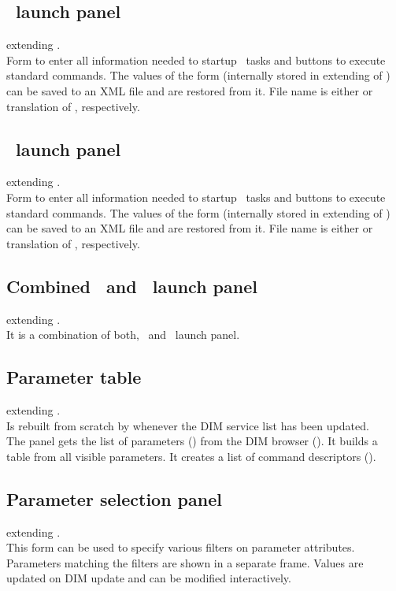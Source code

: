 \subsection[DABC launch panel]{\dabc\ launch panel}
 extending .\\
Form to enter all information needed to startup \dabc\ tasks and
buttons to execute standard commands.
The values of the form (internally stored in  extending of )
can be saved to an XML file and are restored from it. File name is either
 or translation of , respectively.
\subsection[MBS launch panel]{\mbs\ launch panel}
 extending .\\
Form to enter all information needed to startup \mbs\ tasks and
buttons to execute standard commands.
The values of the form (internally stored in  extending of )
can be saved to an XML file and are restored from it. File name is either
 or translation of , respectively.
\subsection[Combined DABC and MBS launch panel]{Combined \dabc\ and \mbs\ launch panel}
 extending .\\
It is a combination of both, \dabc\ and \mbs\ launch panel.
\subsection{Parameter table}
 extending .\\
Is rebuilt from scratch by  whenever the DIM service list has been updated.\\
The panel gets the list of parameters () from the DIM browser (). It builds a table from all visible parameters.
It creates a list of command descriptors ().
\subsection{Parameter selection panel}
 extending .\\
This form can be used to specify various filters on parameter attributes.
Parameters matching the filters are shown in a separate frame. Values
are updated on DIM update and can be modified interactively.
